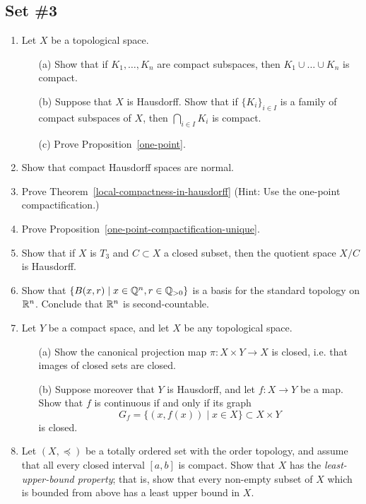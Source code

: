 \subsection{Set \#3}
  \begin{enumerate}[label=3.\arabic*]
    \item \label{one-point-exercise}Let $X$ be a topological space.
    \begin{itemize}
      \item[(a)] Show that if $K_1, \dots, K_n$ are compact subspaces, then $K_1 \cup \dots \cup K_n$ is compact.
      \item[(b)] Suppose that $X$ is Hausdorff. Show that if $\{K_i\}_{i \in I}$ is a family of compact subspaces of $X$, then $\bigcap_{i \in I} K_i$ is compact.
      \item[(c)] Prove Proposition~\ref{one-point}.
    \end{itemize}
    \item Show that compact Hausdorff spaces are normal.
    \item \label{local-compactness-in-hausdorff-exercise}Prove Theorem~\ref{local-compactness-in-hausdorff} (Hint: Use the one-point compactification.)
    \item \label{one-point-compactification-unique-exercise}Prove Proposition~\ref{one-point-compactification-unique}.
    \item Show that if $X$ is $T_3$ and $C \subset X$ a closed subset, then the quotient space $X/C$ is Hausdorff.
    \item \label{second-countable-exercise}Show that $\{B(x,r) \mid x \in \mathbb{Q}^n, r \in \mathbb{Q}_{> 0}\}$ is a basis for the standard topology on $\mathbb{R}^n$. Conclude that $\mathbb{R}^n$ is second-countable.
    \item Let $Y$ be a compact space, and let $X$ be any topological space.
      \begin{itemize}
      \item[(a)] Show the canonical projection map $\pi : X \times Y \to X$ is closed, i.e. that images of closed sets are closed.
      \item[(b)] Suppose moreover that $Y$ is Hausdorff, and let $f : X \to Y$ be a map. Show that $f$ is continuous if and only if its graph
        \[
          G_f = \{(x,f(x)) \mid x \in X\} \subset X \times Y
        \]
        is closed.
      \end{itemize}
    \item Let $(X,\preceq)$ be a totally ordered set with the order topology, and assume that all every closed interval $[a,b]$ is compact. Show that $X$ has the \emph{least-upper-bound property}; that is, show that every non-empty subset of $X$ which is bounded from above has a least upper bound in $X$.

\end{enumerate}
